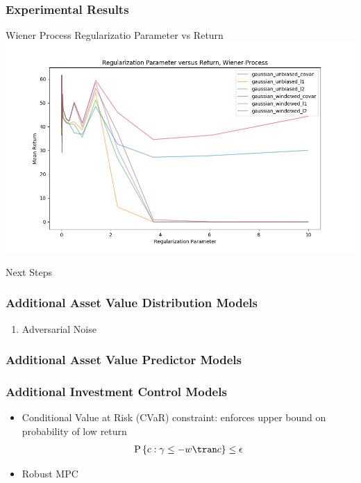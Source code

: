 \documentclass{beamer}
\begin{document}
\begin{frame}
    \frametitle{Experimental Results}

    \begin{block}{Wiener Process Regularizatio Parameter vs Return}
        \includegraphics[width=\linewidth]{gammma_vs_return-Wiener-Process.png}
    \end{block}

\end{frame}



\begin{frame}
    \Huge{\centerline{Next Steps}}
\end{frame}


\begin{frame}
    \frametitle{Additional Asset Value Distribution Models}
    \begin{enumerate}
        \item Adversarial Noise
    \end{enumerate}
\end{frame}

\begin{frame}
    \frametitle{Additional Asset Value Predictor Models}

\end{frame}

\begin{frame}
    \frametitle{Additional Investment Control Models}

    \begin{itemize}
      \item Conditional Value at Risk (CVaR) constraint: enforces upper bound on probability of low return
        \begin{align*}
          \mathrm{P}\left\{c : \gamma \leq -w\tran c \right\} \leq \epsilon
        \end{align*}

      \item Robust MPC
    \end{itemize}

\end{frame}
\end{document}
